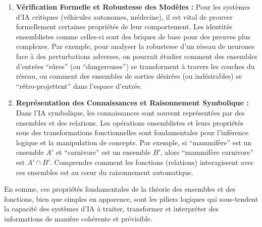 \documentclass[12pt,a4paper]{report}
\providecommand{\tightlist}{%
  \setlength{\itemsep}{0pt}\setlength{\parskip}{0pt}}
\begin{document}
\begin{enumerate}
  \begin{itemize}
  \tightlist
  \item
    La propriété \(f^{-1}(A' \cap B') = f^{-1}(A') \cap f^{-1}(B')\) est
    particulièrement pertinente. Supposons que \(A'\) représente
    l'ensemble des sorties ``chat'' et \(B'\) l'ensemble des sorties
    ``animal à quatre pattes''. L'intersection \(A' \cap B'\) serait
    l'ensemble des sorties ``chat ET animal à quatre pattes''. La
    propriété démontrée signifie que l'ensemble des images qui sont
    classées comme ``chat ET animal à quatre pattes'' est exactement
    l'intersection des images classées comme ``chat'' et des images
    classées comme ``animal à quatre pattes''. Cela garantit une
    interprétation logique et cohérente des prédictions du modèle,
    essentielle pour la robustesse et l'explicabilité des systèmes d'IA.
  \end{itemize}
\item
  \textbf{Vérification Formelle et Robustesse des Modèles :} Pour les
  systèmes d'IA critiques (véhicules autonomes, médecine), il est vital
  de prouver formellement certaines propriétés de leur comportement. Les
  identités ensemblistes comme celles-ci sont des briques de base pour
  des preuves plus complexes. Par exemple, pour analyser la robustesse
  d'un réseau de neurones face à des perturbations adverses, on pourrait
  étudier comment des ensembles d'entrées ``sûres'' (ou ``dangereuses'')
  se transforment à travers les couches du réseau, ou comment des
  ensembles de sorties désirées (ou indésirables) se
  ``rétro-projettent'' dans l'espace d'entrée.
\item
  \textbf{Représentation des Connaissances et Raisonnement Symbolique :}
  Dans l'IA symbolique, les connaissances sont souvent représentées par
  des ensembles et des relations. Les opérations ensemblistes et leurs
  propriétés sous des transformations fonctionnelles sont fondamentales
  pour l'inférence logique et la manipulation de concepts. Par exemple,
  si ``mammifère'' est un ensemble \(A'\) et ``carnivore'' est un
  ensemble \(B'\), alors ``mammifère carnivore'' est \(A' \cap B'\).
  Comprendre comment les fonctions (relations) interagissent avec ces
  ensembles est au cœur du raisonnement automatique.
\end{enumerate}

En somme, ces propriétés fondamentales de la théorie des ensembles et
des fonctions, bien que simples en apparence, sont les piliers logiques
qui sous-tendent la capacité des systèmes d'IA à traiter, transformer et
interpréter des informations de manière cohérente et prévisible.
\newpage
\end{document}
